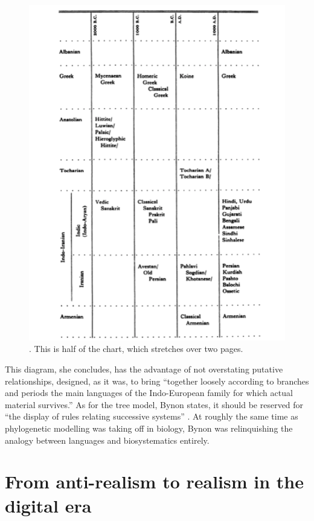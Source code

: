 \documentclass[output=paper]{langscibook}
\begin{document}
\begin{figure}
    \centering
    \includegraphics[scale=1]{figures/bynon1977-68.png}
    \caption{\citet[68]{Bynon1977}. This is half of the chart, which stretches over two pages.}
    \label{fig:kaplan:bynon197768}
\end{figure}

This diagram, she concludes, has the advantage of not overstating putative relationships, designed, as it was, to bring ``together loosely according to branches and periods the main languages of the Indo-European family for which actual material survives.'' As for the tree model, Bynon states, it should be reserved for ``the display of rules relating successive systems'' \citep[70]{Bynon1977}. At roughly the same time as phylogenetic modelling was taking off in biology, Bynon was relinquishing the analogy between languages and biosystematics entirely.

\section{From anti-realism to realism in the digital era}
\label{sec:kaplan:realism}
\end{document}
